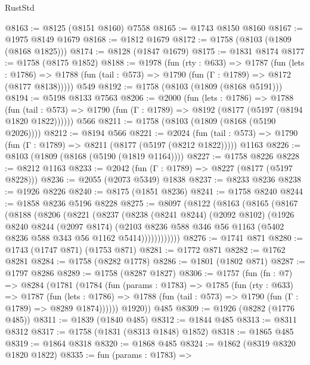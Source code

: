 \begin{lexlean}{RustStd}
\begin{coremodule}
@8163 := @8125 (@8151 @8160) @7558
@8165 := @1743 @8150 @8160
@8167 := @1975 @8149 @1679
@8168 := @1812 @1679
@8172 := @1758 (@8103 (@1809 (@8168 @1825)))
@8174 := @8128 (@1847 @1679)
@8175 := @1831 @8174
@8177 := @1758 (@8175 @1852)
@8188 := @1978
    (fun (rty : @633) =>
    @1787
      (fun (lets : @1786) =>
      @1788 (fun (tail : @573) => @1790 (fun (Γ : @1789) => @8172 (@8177 @8138)))))
    @549
@8192 := @1758 (@8103 (@1809 (@8168 @5191)))
@8194 := @5198 @8133 @7563
@8206 := @2000
    (fun (lets : @1786) =>
    @1788
      (fun (tail : @573) => @1790 (fun (Γ : @1789) => @8192 (@8177 (@5197 (@8194 @1820 @1822))))))
    @566
@8211 := @1758 (@8103 (@1809 (@8168 (@5190 @2026))))
@8212 := @8194 @566
@8221 := @2024
    (fun (tail : @573) => @1790 (fun (Γ : @1789) => @8211 (@8177 (@5197 (@8212 @1822)))))
    @1163
@8226 := @8103 (@1809 (@8168 (@5190 (@1819 @1164))))
@8227 := @1758 @8226
@8228 := @8212 @1163
@8233 := @2042 (fun (Γ : @1789) => @8227 (@8177 (@5197 @8228)))
@8236 := @2055 (@2073 @5349) @1838
@8237 := @8233 @8236
@8238 := @1926 @8226
@8240 := @8175 (@1851 @8236)
@8241 := @1758 @8240
@8244 := @1858 @8236 @5196 @8228
@8275 := @8097
    (@8122
      (@8163
        (@8165
          (@8167
            (@8188
              (@8206
                (@8221
                  (@8237
                    (@8238
                      (@8241 @8244)
                      (@2092 @8102)
                      (@1926
                        @8240
                        @8244
                        (@2097 @8174)
                        (@2103
                          @8236
                          @588
                          @346
                          @56
                          @1163
                          (@5402 @8236 @588 @343 @56 @1162 @5414))))))))))))
@8276 := @1741 @871
@8280 := @1743 (@1747 @871) (@1753 @871)
@8281 := @1772 @871
@8282 := @1762 @8281
@8284 := @1758 (@8282 @1778)
@8286 := @1801 (@1802 @871)
@8287 := @1797 @8286
@8289 := @1758 (@8287 @1827)
@8306 := @1757
    (fun (fn : @7) =>
    @8284
      (@1781
        (@1784
          (fun (params : @1783) =>
          @1785
            (fun (rty : @633) =>
            @1787
              (fun (lets : @1786) =>
              @1788 (fun (tail : @573) => @1790 (fun (Γ : @1789) => @8289 @1874))))))
        @1920))
    @485
@8309 := @1926 (@8282 (@1776 @485))
@8311 := @1839 (@1840 @485)
@8312 := @1844 @485
@8313 := @8311 @8312
@8317 := @1758 (@1831 (@8313 @1848) @1852)
@8318 := @1865 @485
@8319 := @1864 @8318
@8320 := @1868 @485
@8324 := @1862 (@8319 @8320 @1820 @1822)
@8335 := fun (params : @1783) =>

\end{coremodule}
\end{lexlean}
